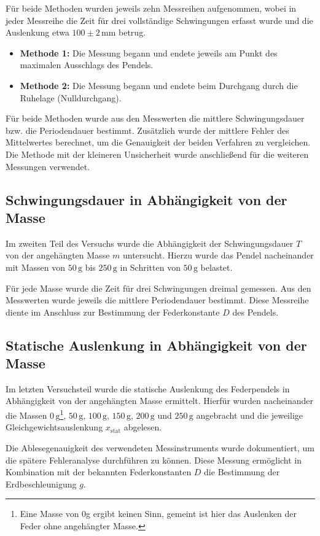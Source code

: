 Für beide Methoden wurden jeweils zehn Messreihen aufgenommen, wobei in jeder Messreihe die Zeit für drei vollständige Schwingungen erfasst wurde und die Auslenkung etwa $100\pm 2 \, \mathrm{mm}$ betrug. 

\begin{itemize}
    \item \textbf{Methode 1:} Die Messung begann und endete jeweils am Punkt des maximalen Ausschlags des Pendels.  
    \item \textbf{Methode 2:} Die Messung begann und endete beim Durchgang durch die Ruhelage (Nulldurchgang).  
\end{itemize}

Für beide Methoden wurde aus den Messwerten die mittlere Schwingungsdauer bzw. die Periodendauer bestimmt. Zusätzlich wurde der mittlere Fehler des Mittelwertes berechnet, um die Genauigkeit der beiden Verfahren zu vergleichen. Die Methode mit der kleineren Unsicherheit wurde anschließend für die weiteren Messungen verwendet.  

\subsection*{Schwingungsdauer in Abhängigkeit von der Masse}
Im zweiten Teil des Versuchs wurde die Abhängigkeit der Schwingungsdauer $T$ von der angehängten Masse $m$ untersucht. Hierzu wurde das Pendel nacheinander mit Massen von $50\,\mathrm{g}$ bis $250\,\mathrm{g}$ in Schritten von $50\,\mathrm{g}$ belastet.  

Für jede Masse wurde die Zeit für drei Schwingungen dreimal gemessen. Aus den Messwerten wurde jeweils die mittlere Periodendauer bestimmt. Diese Messreihe diente im Anschluss zur Bestimmung der Federkonstante $D$ des Pendels.  

\subsection*{Statische Auslenkung in Abhängigkeit von der Masse}
Im letzten Versuchsteil wurde die statische Auslenkung des Federpendels in Abhängigkeit von der angehängten Masse ermittelt. Hierfür wurden nacheinander die Massen $0\,\mathrm{g}$\footnote{Eine Masse von 0g ergibt keinen Sinn, gemeint ist hier das Auslenken der Feder ohne angehängter Masse.}, $50\,\mathrm{g}$, $100\,\mathrm{g}$, $150\,\mathrm{g}$, $200\,\mathrm{g}$ und $250\,\mathrm{g}$ angebracht und die jeweilige Gleichgewichtsauslenkung $x_\text{stat}$ abgelesen.  

Die Ablesegenauigkeit des verwendeten Messinstruments wurde dokumentiert, um die spätere Fehleranalyse durchführen zu können. Diese Messung ermöglicht in Kombination mit der bekannten Federkonstanten $D$ die Bestimmung der Erdbeschleunigung $g$.  